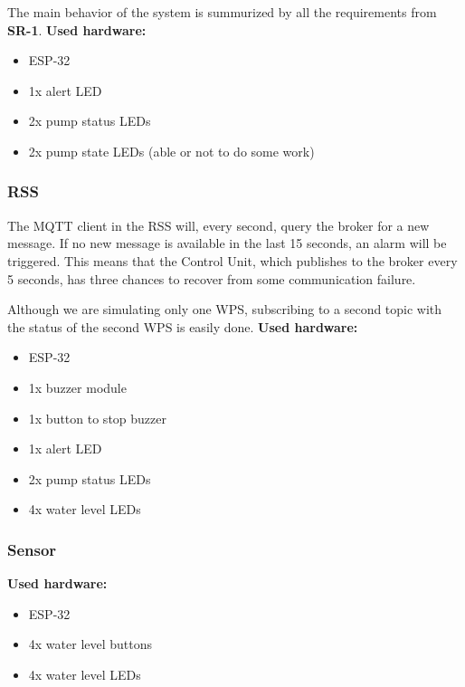 \documentclass[11pt]{article}
\begin{document}
The main behavior of the system is summurized by all the requirements from \textbf{SR-1}.
\newline
\newline
\noindent
\textbf{Used hardware:}
\begin{itemize}
	\setlength\itemsep{0em}
	\item ESP-32
	\item 1x alert LED
	\item 2x pump status LEDs
	\item 2x pump state LEDs (able or not to do some work)
\end{itemize}

\subsubsection{RSS}

The MQTT client in the RSS will, every second, query the broker for a new message. If no new message is available in the last 15 seconds, an alarm will be triggered. This means that the Control Unit, which publishes to the broker every 5 seconds, has three chances to recover from some communication failure. 

Although we are simulating only one WPS, subscribing to a second topic with the status of the second WPS is easily done.
\newline
\newline
\noindent
\textbf{Used hardware:}
\begin{itemize}
	\setlength\itemsep{0em}
	\item ESP-32
	\item 1x buzzer module
	\item 1x button to stop buzzer
	\item 1x alert LED
	\item 2x pump status LEDs
	\item 4x water level LEDs
\end{itemize}

\subsubsection{Sensor}
\noindent
\textbf{Used hardware:}
\begin{itemize}
	\setlength\itemsep{0em}
	\item ESP-32
	\item 4x water level buttons
	\item 4x water level LEDs
\end{itemize}
\end{document}
